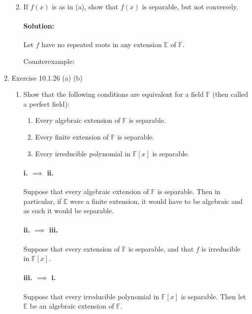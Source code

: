 \documentclass{article}
\begin{document}
\begin{enumerate}
\begin{enumerate}
\begin{enumerate}
            \end{enumerate}   
            \item If $f (x)$ is as in (a), show that $f (x)$ is separable, but not conversely.

              \paragraph{Solution:} Let $f$ have no repeated roots in any extension $\mathbb{E}$ 
              of $\mathbb{F}$. 

              Counterexample: 
    \end{enumerate}
\item Exercise 10.1.26 (a) (b)
    \begin{enumerate}
        \item Show that the following conditions are equivalent for a field $\mathbb{F}$ 
            (then called a perfect field):
        \begin{enumerate}
            \item Every algebraic extension of $\mathbb{F}$ is separable.
            \item Every finite extension of $\mathbb{F}$ is separable.
            \item Every irreducible polynomial in $\mathbb{F}[x]$ is separable.
        \end{enumerate}

          \paragraph{i. $\implies$ ii. } Suppose that every algebraic extension of $\mathbb{F}$ 
          is separable. Then in particular, if $\mathbb{E}$ were a finite extension, it would have to be
          algebraic and as such it would be separable.
          \paragraph{ii. $\implies$ iii. } Suppose that every extension of $\mathbb{F}$ is separable, and
          that $f$ is irreducible in $\mathbb{F}[x]$. %

          \paragraph{iii. $\implies$ i. } Suppose that every irreducible polynomial in $\mathbb{F}[x]$ is 
          separable. Then let $\mathbb{E}$ be an algebraic extension of $\mathbb{F}$. 



\end{enumerate}
\end{enumerate}
\end{document}
